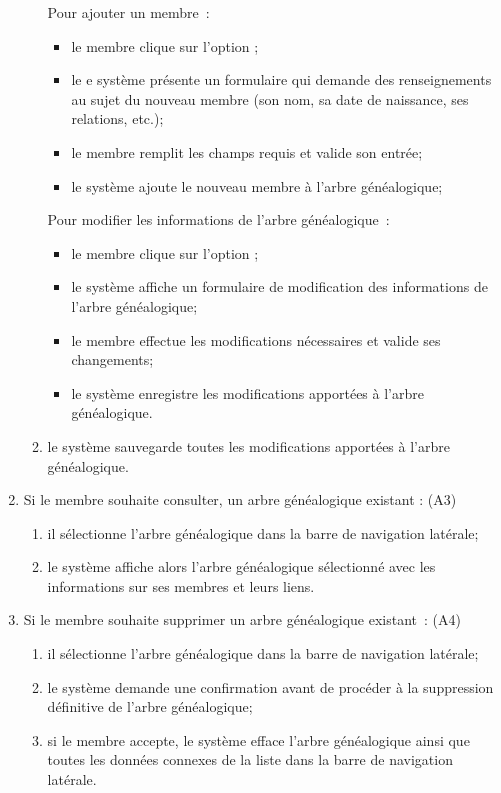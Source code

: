 \begin{enumerate}
\begin{enumerate}
        \subitem Pour ajouter un membre :

          \begin{itemize}
            \item le membre clique sur l’option ;
            \item le e système présente un formulaire qui demande des
              renseignements au sujet du nouveau membre (son nom, sa date de
              naissance, ses relations, etc.);
            \item le membre remplit les champs requis et valide son entrée;
            \item le système ajoute le nouveau membre à l’arbre généalogique;
          \end{itemize}

        \subitem Pour modifier les informations de l’arbre généalogique :

          \begin{itemize}
            \item le membre clique sur l’option ;
            \item le système affiche un formulaire de modification des informations de l’arbre généalogique;
            \item le membre effectue les modifications nécessaires et valide ses changements;
            \item le système enregistre les modifications apportées à l’arbre généalogique.
          \end{itemize}

      \item le système sauvegarde toutes les modifications apportées à l’arbre généalogique.
    \end{enumerate}

  \item Si le membre souhaite consulter, un arbre généalogique existant : (A3)
    \begin{enumerate}
      \item il sélectionne l’arbre généalogique dans la barre de navigation latérale;
      \item le système affiche alors l’arbre généalogique sélectionné avec les
        informations sur ses membres et leurs liens.
    \end{enumerate}

  \item Si le membre souhaite supprimer un arbre généalogique existant : (A4)
    \begin{enumerate}
      \item il sélectionne l’arbre généalogique dans la barre de navigation latérale;
      \item le système demande une confirmation avant de procéder à la
        suppression définitive de l’arbre généalogique;
      \item si le membre accepte, le système efface l’arbre généalogique
        ainsi que toutes les données connexes de la liste dans la barre de
        navigation latérale.
    \end{enumerate}

\end{enumerate}

